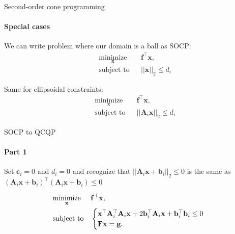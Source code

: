 \documentclass{beamer}
\begin{document}
\begin{frame}{Second-order cone programming}
\framesubtitle{Special cases}
\begin{flushleft}

We can write problem where our domain is a ball as SOCP:
%
\begin{equation}
\begin{aligned}
& \underset{\mathbf{x}}{\text{minimize}}
& & \mathbf{f}^\top\mathbf{x}, \\
& \text{subject to}
& & ||\mathbf{x}||_2 \leq d_i
\end{aligned}
\end{equation}

\bigskip

Same for ellipsoidal constraints:
%
\begin{equation}
\begin{aligned}
& \underset{\mathbf{x}}{\text{minimize}}
& & \mathbf{f}^\top\mathbf{x}, \\
& \text{subject to}
& & ||\mathbf{A}_i\mathbf{x}||_2 \leq d_i
\end{aligned}
\end{equation}
 
\end{flushleft}
\end{frame}




\begin{frame}{SOCP to QCQP}
\framesubtitle{Part 1}
\begin{flushleft}

Set $\mathbf{c}_i = 0$ and $d_i = 0$ and recognize that $||\mathbf{A}_i\mathbf{x} + \mathbf{b}_i||_2 \leq 0$ is the same as $(\mathbf{A}_i\mathbf{x} + \mathbf{b}_i)^\top (\mathbf{A}_i\mathbf{x} + \mathbf{b}_i) \leq 0$

\bigskip
%
\begin{equation}
\begin{aligned}
& \underset{\mathbf{x}}{\text{minimize}}
& & \mathbf{f}^\top\mathbf{x}, \\
& \text{subject to}
& & \begin{cases}
    \mathbf{x}^\top \mathbf{A}_i^\top \mathbf{A}_i \mathbf{x} + 
    2 \mathbf{b}_i^\top \mathbf{A}_i\mathbf{x} + 
    \mathbf{b}_i^\top \mathbf{b}_i  \leq 0\\
    \mathbf{F}\mathbf{x} = \mathbf{g}.
    \end{cases}
\end{aligned}
\end{equation}

\end{flushleft}
\end{frame}
\end{document}
